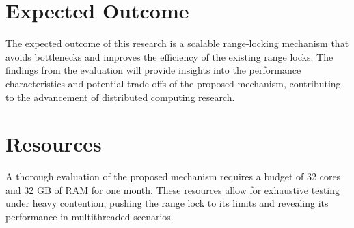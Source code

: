 \section{Expected Outcome}
The expected outcome of this research is a scalable range-locking mechanism that avoids bottlenecks and improves the efficiency of the existing range locks. The findings from the evaluation will provide insights into the performance characteristics and potential trade-offs of the proposed mechanism, contributing to the advancement of distributed computing research.

\section{Resources}
A thorough evaluation of the proposed mechanism requires a budget of 32 cores and 32 GB of RAM for one month. These resources allow for exhaustive testing under heavy contention, pushing the range lock to its limits and revealing its performance in multithreaded scenarios.
